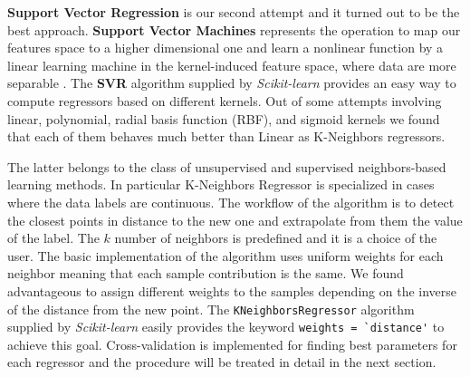 \textbf{Support Vector Regression} is our second attempt and it turned out to be the best approach. \textbf{Support Vector Machines} represents the operation to map our features space to a higher dimensional one and learn a nonlinear function by a linear learning machine in the kernel-induced feature space, where data are more separable \cite{yang2008regression}. The \textbf{SVR} algorithm supplied by \textit{Scikit-learn} provides an easy way to compute regressors based on different kernels. Out of some attempts involving linear, polynomial, radial basis function (RBF), and sigmoid kernels we found that each of them behaves much better than Linear as K-Neighbors regressors. 

The latter belongs to the class of unsupervised and supervised neighbors-based learning methods. In particular K-Neighbors Regressor is specialized in cases where the data labels are continuous. The workflow of the algorithm is to detect the closest points in distance to the new one and extrapolate from them the value of the label. The $k$ number of neighbors is predefined and it is a choice of the user. The basic implementation of the algorithm uses uniform weights for each neighbor meaning that each sample contribution is the same. We found advantageous to assign different weights to the samples depending on the inverse of the distance from the new point. The  \lstinline{KNeighborsRegressor} algorithm supplied by \textit{Scikit-learn} easily provides the keyword \lstinline{weights = `distance'} to achieve this goal.
Cross-validation is implemented for finding best parameters for each regressor and the procedure will be treated in detail in the next section. 